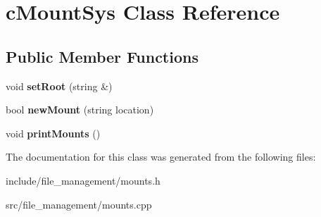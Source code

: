 \hypertarget{classcMountSys}{\section{c\-Mount\-Sys \-Class \-Reference}
\label{d8/dfe/classcMountSys}
}
\subsection*{\-Public \-Member \-Functions}
\begin{DoxyCompactItemize}
\item 
\hypertarget{classcMountSys_a495ef5e6d5743705d2be4f5a1c14c4b5}{void {\bfseries set\-Root} (string \&)}\label{d8/dfe/classcMountSys_a495ef5e6d5743705d2be4f5a1c14c4b5}

\item 
\hypertarget{classcMountSys_a705f723af4efcf73271787ab61dacd99}{bool {\bfseries new\-Mount} (string location)}\label{d8/dfe/classcMountSys_a705f723af4efcf73271787ab61dacd99}

\item 
\hypertarget{classcMountSys_adcd5ee25a58026dab99c25ac0bc12523}{void {\bfseries print\-Mounts} ()}\label{d8/dfe/classcMountSys_adcd5ee25a58026dab99c25ac0bc12523}

\end{DoxyCompactItemize}


\-The documentation for this class was generated from the following files\-:\begin{DoxyCompactItemize}
\item 
include/file\-\_\-management/mounts.\-h\item 
src/file\-\_\-management/mounts.\-cpp\end{DoxyCompactItemize}
